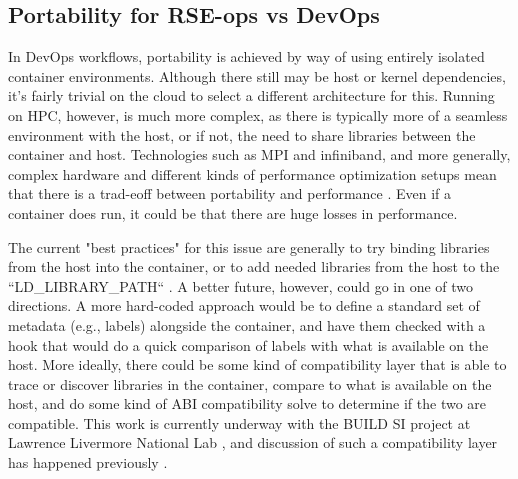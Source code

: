 \subsection{Portability for RSE-ops vs DevOps}

In DevOps workflows, portability is achieved by way of using entirely isolated container environments. Although there still may be host or kernel dependencies, it's fairly trivial on the cloud to select a different architecture for this.
Running on HPC, however, is much more complex, as there is typically more of a seamless environment with the host, or if not, the need to share libraries between the container and host. Technologies such as MPI and infiniband, and more generally, complex hardware and different kinds of performance optimization setups mean that there is a trad-eoff between portability and performance \cite{Younge2019-uk}. Even if a container does run, it could be that there are huge losses in performance. 

The current "best practices" for this issue are generally to try binding libraries from the host into the container, or to add needed libraries from the host to the ``LD\_LIBRARY\_PATH`` \cite{Younge2019-uk}. A better future, however, could go in one of two directions. A more hard-coded approach would be to define a standard set of metadata (e.g., labels) alongside the container, and have them checked with a hook \cite{oci-hooks} that would do a quick comparison of labels with what is available on the host. More ideally, there could be some kind of compatibility layer that is able to trace or discover libraries in the container, compare to what is available on the host, and do some kind of ABI compatibility solve to determine if the two are compatible. This work is currently underway with the BUILD SI project at Lawrence Livermore National Lab \cite{buildsi}, and discussion of such a compatibility layer has happened previously \cite{Younge2019-uk}.
